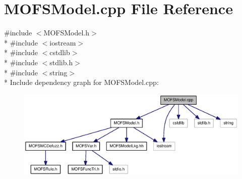 \section{M\-O\-F\-S\-Model.\-cpp File Reference}
\label{MOFSModel_8cpp}
{\ttfamily \#include $<$M\-O\-F\-S\-Model.\-h$>$}\\*
{\ttfamily \#include $<$iostream$>$}\\*
{\ttfamily \#include $<$cstdlib$>$}\\*
{\ttfamily \#include $<$stdlib.\-h$>$}\\*
{\ttfamily \#include $<$string$>$}\\*
Include dependency graph for M\-O\-F\-S\-Model.\-cpp\-:\nopagebreak
\begin{figure}[H]
\begin{center}
\leavevmode
\includegraphics[width=350pt]{MOFSModel_8cpp__incl}
\end{center}
\end{figure}
